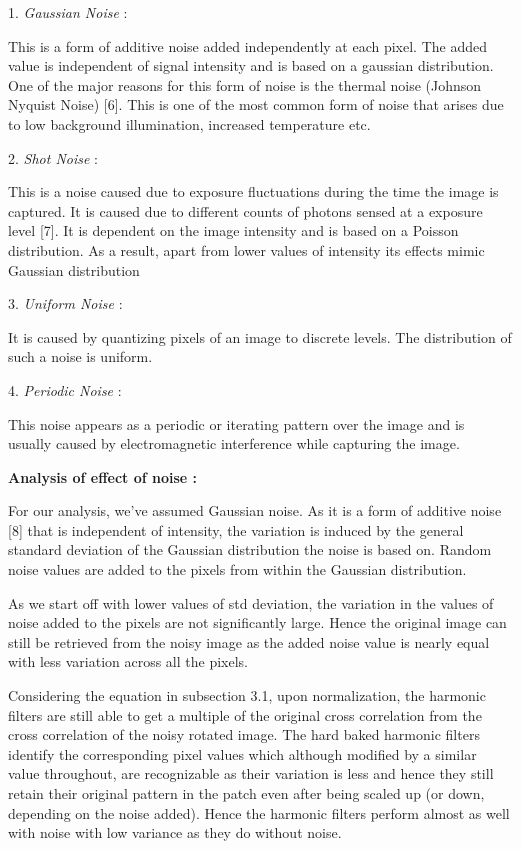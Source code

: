 \documentclass{article}
\begin{document}
1.	\emph{Gaussian Noise} : 

This is a form of additive noise added independently at each pixel. The added value is independent of signal intensity and is based on a gaussian distribution. One of the major reasons for this form of noise is the thermal noise (Johnson Nyquist Noise) [6]. This is one of the most common form of noise that arises due to low background illumination, increased temperature etc.

2.	\emph{Shot Noise} :

This is a noise caused due to exposure fluctuations during the time the image is captured. It is caused due to different counts of photons sensed at a exposure level [7]. It is dependent on the image intensity and is based on a Poisson distribution. As a result, apart from lower values of intensity its effects mimic Gaussian distribution

3.	\emph{Uniform Noise} : 

It is caused by quantizing pixels of an image to discrete levels. The distribution of such a noise is uniform.

4.	\emph{Periodic Noise} :

This noise appears as a periodic or iterating pattern over the image and is usually caused by electromagnetic interference while capturing the image.

\textbf{Analysis of effect of noise : }

For our analysis, we've assumed Gaussian noise. As it is a form of additive noise [8] that is independent of intensity, the variation is induced by the general standard deviation of the Gaussian distribution the noise is based on. Random noise values are added to the pixels from within the Gaussian distribution. 

As we start off with lower values of std deviation, the variation in the values of noise added to the pixels are not significantly large. Hence the original image can still be retrieved from the noisy image as the added noise value is nearly equal with less variation across all the pixels. 

Considering the equation in subsection 3.1, upon normalization, the harmonic filters are still able to get a multiple of the original cross correlation from the cross correlation of the noisy rotated image. The hard baked harmonic filters identify the corresponding pixel values  which although modified by a similar value throughout, are recognizable as their variation is less and hence they still retain their original pattern in the patch even after being scaled up (or down, depending on the noise added). Hence the harmonic filters perform almost as well with noise with low variance as they do without noise.
\end{document}
